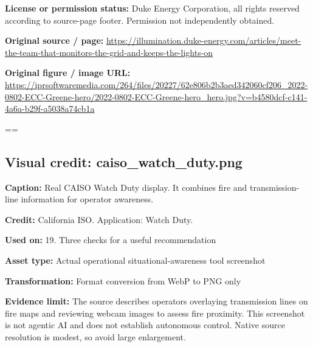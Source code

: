 \documentclass[10pt,letterpaper]{article}
\begin{document}
\textbf{License or permission status:} Duke Energy Corporation, all rights reserved according to source-page footer. Permission not independently obtained.\par
\textbf{Original source / page:} \href{https://illumination.duke-energy.com/articles/meet-the-team-that-monitors-the-grid-and-keeps-the-lights-on}{\small\ttfamily https:/\allowbreak{}/\allowbreak{}illumination.\allowbreak{}duke-\allowbreak{}energy.\allowbreak{}com/\allowbreak{}articles/\allowbreak{}meet-\allowbreak{}the-\allowbreak{}team-\allowbreak{}that-\allowbreak{}monitors-\allowbreak{}the-\allowbreak{}grid-\allowbreak{}and-\allowbreak{}keeps-\allowbreak{}the-\allowbreak{}lights-\allowbreak{}on}\par
\textbf{Original figure / image URL:} \href{https://iprsoftwaremedia.com/264/files/20227/62e806b2b3aed342060cf206_2022-0802-ECC-Greene-hero/2022-0802-ECC-Greene-hero_hero.jpg?v=b4580dcf-c141-4a6a-b29f-a5038a74cb1a}{\small\ttfamily https:/\allowbreak{}/\allowbreak{}iprsoftwaremedia.\allowbreak{}com/\allowbreak{}264/\allowbreak{}files/\allowbreak{}20227/\allowbreak{}62e806b2b3aed342060cf206\_\allowbreak{}2022-\allowbreak{}0802-\allowbreak{}ECC-\allowbreak{}Greene-\allowbreak{}hero/\allowbreak{}2022-\allowbreak{}0802-\allowbreak{}ECC-\allowbreak{}Greene-\allowbreak{}hero\_\allowbreak{}hero.\allowbreak{}jpg?\allowbreak{}v=\allowbreak{}b4580dcf-\allowbreak{}c141-\allowbreak{}4a6a-\allowbreak{}b29f-\allowbreak{}a5038a74cb1a}\par
\egroup\par\noindent\box\readingEntry\par\medskip
\setbox\readingEntry=\vbox\bgroup\hsize=\linewidth\subsection*{Visual credit: caiso\_watch\_duty.png}
\textbf{Caption:} Real CAISO Watch Duty display. It combines fire and transmission-line information for operator awareness.\par
\textbf{Credit:} California ISO. Application: Watch Duty.\par
\textbf{Used on:} 19. Three checks for a useful recommendation\par
\textbf{Asset type:} Actual operational situational-awareness tool screenshot\par
\textbf{Transformation:} Format conversion from WebP to PNG only\par
\textbf{Evidence limit:} The source describes operators overlaying transmission lines on fire maps and reviewing webcam images to assess fire proximity. This screenshot is not agentic AI and does not establish autonomous control. Native source resolution is modest, so avoid large enlargement.\par
\end{document}
